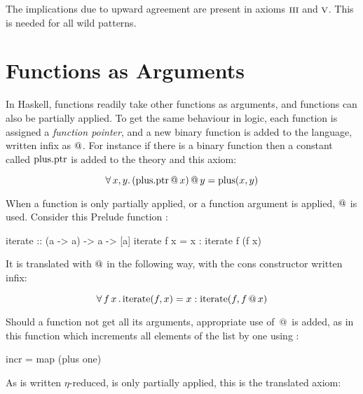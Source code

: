 \begin{comment}
Some room for improvement can be seen: the inserted
\hs{even }$\bot$\hs{ = }$\bot$ case is redundant as it is implied by
the wild pattern to $\bot$.
\end{comment}

The implications due to upward agreement are present in axioms
$\romnodot{3}$ and $\romnodot{5}$. This is needed for all wild
patterns.

\section{Functions as Arguments}

In Haskell, functions readily take other functions as arguments, and
functions can also be partially applied. To get the same behaviour in
logic, each function is assigned a \emph{function pointer}, and a new
binary function is added to the language, written infix as $@$.
For instance if there is a binary function  then a constant
called $\mathrm{plus.ptr}$ is added to the theory and this axiom:

\begin{equation*}
\forall \, x , y . \,  (\mathrm{plus.ptr} \, @ \, x) \, @ \, y = \mathrm{plus}(x,y)
\end{equation*}

When a function is only partially applied, or a function argument is
applied, $@$ is used. Consider this Prelude function :

\begin{code}
iterate :: (a -> a) -> a -> [a]
iterate f x = x : iterate f (f x)
\end{code}

It is translated with $@$ in the following way, with the cons
constructor \hs{:} written infix:

\begin{equation*}
\forall \, f \, x \, . \, \mathrm{iterate}(f,x) = x : \mathrm{iterate}(f,f \, @ \, x)
\end{equation*}

Should a function not get all its arguments, appropriate use of $\, @ \, $ is
added, as in this function which increments all elements of the list
by one using :

\begin{code}
incr = map (plus one)
\end{code}

As  is written $\eta$-reduced,  is
only partially applied, this is the translated axiom:

